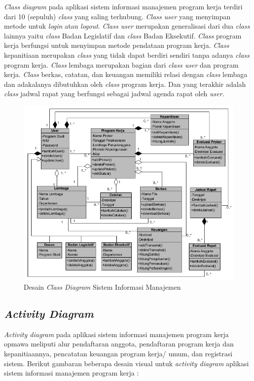 \textit{Class diagram} pada aplikasi sistem informasi manajemen program kerja terdiri dari 10 (sepuluh) \textit{class} yang saling terhubung. \textit{Class user} yang menyimpan metode untuk \textit{login} atau \textit{logout}. \textit{Class user} merupakan generalisasi dari dua \textit{class} lainnya yaitu \textit{class} Badan Legislatif dan \textit{class} Badan Eksekutif. \textit{Class} program kerja berfungsi untuk menyimpan metode pendataan program kerja. \textit{Class} kepanitiaan merupakan \textit{class} yang tidak dapat berdiri sendiri tanpa adanya \textit{class} program kerja. \textit{Class} lembaga merupakan bagian dari \textit{class user} dan program kerja. \textit{Class} berkas, catatan, dan keuangan memiliki relasi dengan \textit{class} lembaga dan adakalanya dibutuhkan oleh \textit{class} program kerja. Dan yang terakhir adalah \textit{class} jadwal rapat yang berfungsi sebagai jadwal agenda rapat oleh \textit{user}.

\begin{figure}[H]
	\centering
	\includegraphics[width=1.0\textwidth]{gambar/after_sps/classv2}
	\caption{Desain \emph{Class Diagram} Sistem Informasi Manajemen}
	\label{class_diagram}
\end{figure}


\subsection{\textit{Activity Diagram}}

\textit{Activity diagram} pada aplikasi sistem informasi manajemen program kerja opmawa meliputi alur pendaftaran anggota, pendaftaran program kerja dan kepanitiaannya, pencatatan keuangan program kerja/ umum, dan registrasi sistem. Berikut gambaran beberapa desain visual untuk \textit{activity diagram} aplikasi sistem informasi manajemen program kerja :

